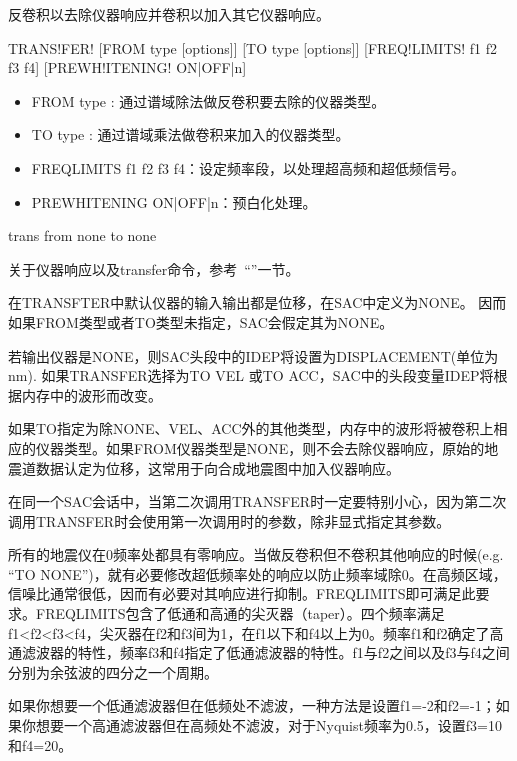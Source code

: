 \label{cmd:transfer}

反卷积以去除仪器响应并卷积以加入其它仪器响应。

\begin{SACSTX}
TRANS!FER! [FROM type [options]] [TO type [options]] 
    [FREQ!LIMITS! f1 f2 f3 f4] [PREWH!ITENING! ON|OFF|n]
\end{SACSTX}

\begin{itemize}
\item FROM type : 通过谱域除法做反卷积要去除的仪器类型。 
\item TO type : 通过谱域乘法做卷积来加入的仪器类型。 
\item FREQLIMITS f1 f2 f3 f4：设定频率段，以处理超高频和超低频信号。
\item PREWHITENING ON|OFF|n：预白化处理。
\end{itemize}

\begin{SACDFT}
trans from none to none
\end{SACDFT}

关于仪器响应以及transfer命令，参考~``''一节。

在TRANSFTER中默认仪器的输入输出都是位移，在SAC中定义为NONE。
因而如果FROM类型或者TO类型未指定，SAC会假定其为NONE。

若输出仪器是NONE，则SAC头段中的IDEP将设置为DISPLACEMENT(单位为nm). 如果TRANSFER选择为TO VEL
或TO ACC，SAC中的头段变量IDEP将根据内存中的波形而改变。

如果TO指定为除NONE、VEL、ACC外的其他类型，内存中的波形将被卷积上相应的仪器类型。如果FROM仪器类型是NONE，则不会去除仪器响应，原始的地震道数据认定为位移，这常用于向合成地震图中加入仪器响应。

在同一个SAC会话中，当第二次调用TRANSFER时一定要特别小心，因为第二次调用TRANSFER时会使用第一次调用时的参数，除非显式指定其参数。

所有的地震仪在0频率处都具有零响应。当做反卷积但不卷积其他响应的时候(e.g. ``TO NONE'')，就有必要修改超低频率处的响应以防止频率域除0。在高频区域，信噪比通常很低，因而有必要对其响应进行抑制。FREQLIMITS即可满足此要求。FREQLIMITS包含了低通和高通的尖灭器（taper）。四个频率满足f1<f2<f3<f4，尖灭器在f2和f3间为1，在f1以下和f4以上为0。频率f1和f2确定了高通滤波器的特性，频率f3和f4指定了低通滤波器的特性。f1与f2之间以及f3与f4之间分别为余弦波的四分之一个周期。

如果你想要一个低通滤波器但在低频处不滤波，一种方法是设置f1=-2和f2=-1；如果你想要一个高通滤波器但在高频处不滤波，对于Nyquist频率为0.5，设置f3=10和f4=20。


